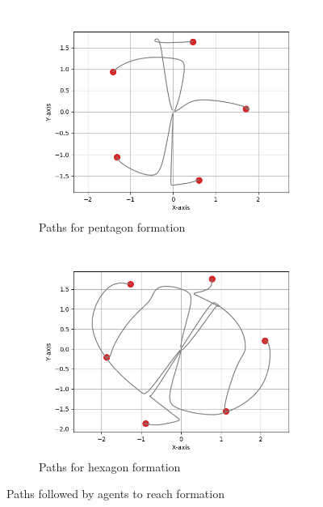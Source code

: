 \documentclass[a4paper,11pt,oneside]{book}
\begin{document}
\begin{figure}
\centering
	\begin{subfigure}{0.48\textwidth}	
	\includegraphics[scale=0.43]{Pentagon_path}
	\caption{Paths for pentagon formation}
	\end{subfigure}
\hfill
	\begin{subfigure}{0.48\textwidth}	
	\includegraphics[scale=0.43]{Hexagon_path}
	\caption{Paths for hexagon formation}
	\end{subfigure}
\caption{Paths followed by agents to reach formation}
\label{Paths}
\end{figure}
\end{document}
